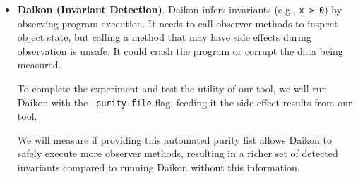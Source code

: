 \begin{itemize}
We will assess whether our analysis effectively filters out methods that have side effects, preventing Randoop from generating ``flaky'' or invalid tests that inadvertently mutate the state they are intended to verify.


\item \textbf{Daikon (Invariant Detection)}. Daikon \cite{DaikonWebsite} infers invariants (e.g., \texttt{x > 0}) by observing program execution. It needs to call observer methods to inspect object state, but calling a method that may have side effects during observation is unsafe. It could crash the program or corrupt the data being measured.

To complete the experiment and test the utility of our tool, we will run Daikon with the \texttt{--purity-file} flag, feeding it the side-effect results from our tool.

We will measure if providing this automated purity list allows Daikon to safely execute more observer methods, resulting in a richer set of detected invariants compared to running Daikon without this information.

\end{itemize}